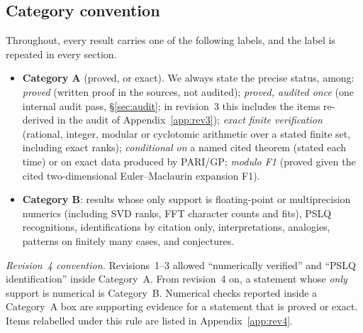 \documentclass[11pt]{article}
\theoremstyle{definition}
\begin{document}
\subsection{Category convention}\label{sec:cat}
Throughout, every result carries one of the following labels, and the label is repeated in every section.
\begin{itemize}[leftmargin=2em]
\item \textbf{Category A} (proved, or exact). We always state the precise status, among:
\emph{proved} (written proof in the sources, not audited); \emph{proved, audited once} (one internal audit
pass, \S\ref{sec:audit}; in revision~3 this includes the items re-derived in the audit of Appendix~\ref{app:rev3}); \emph{exact finite verification}
(rational, integer, modular or cyclotomic arithmetic over a stated finite set, including exact ranks); \emph{conditional on} a named cited theorem
(stated each time) or on exact data produced by PARI/GP; \emph{modulo F1} (proved given the cited two-dimensional Euler--Maclaurin expansion F1).
\item \textbf{Category B}: results whose only support is floating-point or multiprecision numerics (including SVD ranks, FFT character counts and
fits), PSLQ recognitions, identifications by citation only, interpretations, analogies, patterns on finitely many cases, and conjectures.
\end{itemize}
\emph{Revision~4 convention.} Revisions~1--3 allowed ``numerically verified'' and ``PSLQ identification'' inside Category~A. From revision~4 on, a
statement whose \emph{only} support is numerical is Category~B. Numerical checks reported inside a Category~A box are supporting evidence for a
statement that is proved or exact. Items relabelled under this rule are listed in Appendix~\ref{app:rev4}.
\end{document}
